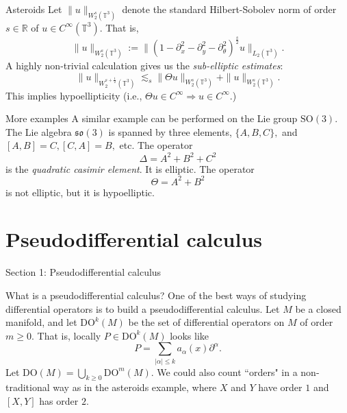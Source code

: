 \documentclass{beamer}
\numberwithin{equation}{section}
\theoremstyle{plain}
\theoremstyle{plain}
\theoremstyle{definition}
\theoremstyle{plain}
\theoremstyle{plain}
\theoremstyle{definition}
\newcommand{\Rl}{\mathbb{R}}
\newcommand{\Circ}{\mathbb{T}}
\begin{document}
\begin{frame}{Asteroids}
 Let $\|u\|_{W^s_2(\Circ^3)}$ denote the standard Hilbert-Sobolev norm of order $s\in \Rl$ of $u\in C^\infty(\Circ^3).$ That is,
 \[
      \|u\|_{W^s_2(\Circ^3)} := \|(1-\partial_x^2-\partial_y^2-\partial_\theta^2)^{\frac{s}{2}}u\|_{L_2(\Circ^3)}.
 \]
 A highly non-trivial calculation gives us the \emph{sub-elliptic estimates}:
  \[
      \|u\|_{W^{s+\frac12}_2(\Circ^3)}\lesssim_s \|\Theta u\|_{W^s_2(\Circ^3)}+\|u\|_{W^s_2(\Circ^3)}.
  \]
  This implies hypoellipticity (i.e., $\Theta u\in C^\infty \Rightarrow u \in C^\infty$.)
\end{frame}

\begin{frame}{More examples}
  A similar example can be performed on the Lie group $\mathrm{SO}(3).$ The Lie algebra $\mathfrak{so}(3)$
  is spanned by three elements, $\{A,B,C\},$ and $[A,B]=C, [C,A] = B,$ etc.
  \pause
  The operator
  \[
      \Delta = A^2+B^2+C^2
  \]
  is the \emph{quadratic casimir element}. It is elliptic.
  \pause
  The operator
  \[
    \Theta = A^2+B^2
  \]
  is not elliptic, but it is hypoelliptic.
\end{frame}
% 
% 



\section{Pseudodifferential calculus}

\begin{frame}
    \huge{Section 1: Pseudodifferential calculus}
\end{frame}

\begin{frame}{What is a pseudodifferential calculus?}
  One of the best ways of studying differential operators is to build a pseudodifferential calculus.
  \pause
  Let $M$ be a closed manifold, and let $\mathrm{DO}^k(M)$ be the set of differential operators on $M$
  of order $m\geq 0.$ That is, locally $P \in \mathrm{DO}^k(M)$ looks like
  \[
    P = \sum_{|\alpha|\leq k} a_{\alpha}(x)\partial^{\alpha}.
  \]
  Let $\mathrm{DO}(M) = \bigcup_{k\geq 0} \mathrm{DO}^m(M).$
  \pause
  We could also count ``orders" in a non-traditional way as in the asteroids example, where $X$ and $Y$ have order $1$ and $[X,Y]$ has order $2.$
\end{frame}
\end{document}
